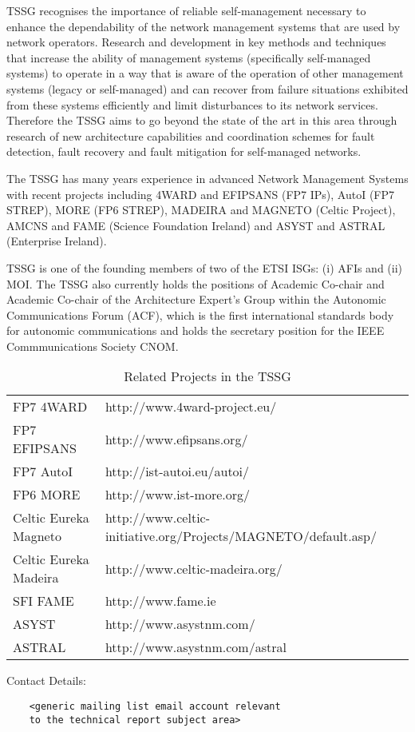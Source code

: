 \ac{TSSG} recognises the importance of reliable self-management necessary to enhance the dependability of the network management systems that are used by network operators. Research and development in key methods and techniques that increase the ability of management systems (specifically self-managed systems) to operate in a way that is aware of the operation of other management systems (legacy or self-managed) and can recover from failure situations exhibited from these systems efficiently and limit disturbances to its network services. Therefore the \ac{TSSG} aims to go beyond the state of the art in this area through research of new architecture capabilities and coordination schemes for fault detection, fault recovery and fault mitigation for self-managed networks.

The \ac{TSSG} has many years experience in advanced Network Management Systems with recent projects including 4WARD and EFIPSANS (FP7 IPs), AutoI (FP7 STREP), MORE (FP6 STREP), MADEIRA and MAGNETO (Celtic Project), AMCNS and FAME (Science Foundation Ireland) and ASYST and ASTRAL (Enterprise Ireland).

\ac{TSSG} is one of the founding members of two of the ETSI \acp{ISG}: (i) \acfp{AFI} and (ii) \acf{MOI}. The \ac{TSSG} also currently holds the positions of Academic Co-chair and Academic Co-chair of the Architecture Expert's Group within the Autonomic Communications Forum (ACF), which is the first international standards body for autonomic communications and holds the secretary position for the IEEE Commmunications Society \ac{CNOM}. 

\begin{table}[h!]
  \begin{center}
    \begin{tabularx}{\textwidth}{ l p{} }
		FP7 4WARD & http://www.4ward-project.eu/ \\
		FP7 EFIPSANS & http://www.efipsans.org/ \\
		FP7 AutoI & http://ist-autoi.eu/autoi/ \\
		FP6 MORE & http://www.ist-more.org/ \\
		Celtic Eureka Magneto & http://www.celtic-initiative.org/Projects/MAGNETO/default.asp/ \\
		Celtic Eureka Madeira & http://www.celtic-madeira.org/ \\
		SFI FAME & http://www.fame.ie \\
		ASYST & http://www.asystnm.com/ \\
		ASTRAL & http://www.asystnm.com/astral \\
    \end{tabularx}
  \end{center}
  \caption{Related Projects in the TSSG}
\end{table}

Contact Details:
\begin{verbatim}
	<generic mailing list email account relevant 
	to the technical report subject area>
\end{verbatim}



